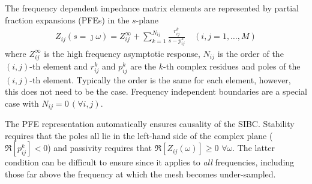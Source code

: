 \documentclass[onecolumn,a4paper]{article}
\numberwithin{equation}{section}
\begin{document}
The frequency dependent impedance matrix elements are represented by partial fraction 
expansions (PFEs) in the $s$-plane
\begin{eqnarray}
Z_{ij}(s=\jmath \omega)
=
Z^\infty_{ij} + \sum_{k=1}^{N_{ij}}
\frac{r^k_{ij}}{s-p^k_{ij}}\,\,\,\,\,\,(i,j=1,\ldots,M)
\end{eqnarray}
where $Z^\infty_{ij}$ is the high frequency asymptotic response, $N_{ij}$ is 
the order of the $(i,j)$-th element and $r^k_{ij}$ and $p^k_{ij}$ are the $k$-th complex
residues and poles of the $(i,j)$-th element. Typically the order is the same for each element, however, this
does not need to be the case. Frequency independent boundaries are a special case with
$N_{ij}=0\,(\forall i,j)$. 

The PFE representation automatically ensures causality of the SIBC. Stability requires 
that the poles all lie in the left-hand side of the complex plane ($\Re[p^k_{ij}]<0$) and passivity
requires that $\Re[Z_{ij}(\omega)]\ge 0\,\,\forall\omega$. The latter condition can be difficult
to ensure since it applies to {\it all} frequencies, including those far above the frequency
at which the mesh becomes under-sampled. 
\end{document}
